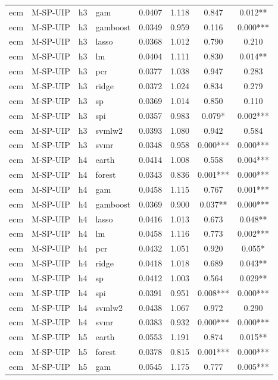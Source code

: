 \begin{ThreePartTable}
\begin{longtable}[t]{llclcccc}
ecm & M-SP-UIP & h3 & gam & 0.0407 & 1.118 & 0.847 & 0.012**\\
ecm & M-SP-UIP & h3 & gamboost & 0.0349 & 0.959 & 0.116 & 0.000***\\
ecm & M-SP-UIP & h3 & lasso & 0.0368 & 1.012 & 0.790 & 0.210\\
ecm & M-SP-UIP & h3 & lm & 0.0404 & 1.111 & 0.830 & 0.014**\\
ecm & M-SP-UIP & h3 & pcr & 0.0377 & 1.038 & 0.947 & 0.283\\
ecm & M-SP-UIP & h3 & ridge & 0.0372 & 1.024 & 0.834 & 0.279\\
ecm & M-SP-UIP & h3 & sp & 0.0369 & 1.014 & 0.850 & 0.110\\
ecm & M-SP-UIP & h3 & spi & 0.0357 & 0.983 & 0.079* & 0.002***\\
ecm & M-SP-UIP & h3 & svmlw2 & 0.0393 & 1.080 & 0.942 & 0.584\\
ecm & M-SP-UIP & h3 & svmr & 0.0348 & 0.958 & 0.000*** & 0.000***\\
\addlinespace
ecm & M-SP-UIP & h4 & earth & 0.0414 & 1.008 & 0.558 & 0.004***\\
ecm & M-SP-UIP & h4 & forest & 0.0343 & 0.836 & 0.001*** & 0.000***\\
ecm & M-SP-UIP & h4 & gam & 0.0458 & 1.115 & 0.767 & 0.001***\\
ecm & M-SP-UIP & h4 & gamboost & 0.0369 & 0.900 & 0.037** & 0.000***\\
ecm & M-SP-UIP & h4 & lasso & 0.0416 & 1.013 & 0.673 & 0.048**\\
ecm & M-SP-UIP & h4 & lm & 0.0458 & 1.116 & 0.773 & 0.002***\\
ecm & M-SP-UIP & h4 & pcr & 0.0432 & 1.051 & 0.920 & 0.055*\\
ecm & M-SP-UIP & h4 & ridge & 0.0418 & 1.018 & 0.689 & 0.043**\\
ecm & M-SP-UIP & h4 & sp & 0.0412 & 1.003 & 0.564 & 0.029**\\
ecm & M-SP-UIP & h4 & spi & 0.0391 & 0.951 & 0.008*** & 0.000***\\
ecm & M-SP-UIP & h4 & svmlw2 & 0.0438 & 1.067 & 0.972 & 0.290\\
ecm & M-SP-UIP & h4 & svmr & 0.0383 & 0.932 & 0.000*** & 0.000***\\
\addlinespace
ecm & M-SP-UIP & h5 & earth & 0.0553 & 1.191 & 0.874 & 0.015**\\
ecm & M-SP-UIP & h5 & forest & 0.0378 & 0.815 & 0.001*** & 0.000***\\
ecm & M-SP-UIP & h5 & gam & 0.0545 & 1.175 & 0.777 & 0.005***\\

\end{longtable}
\end{ThreePartTable}
